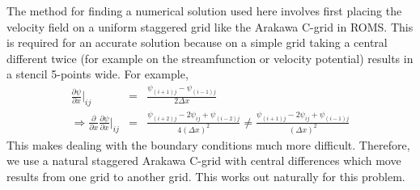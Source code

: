 \documentclass{article}
\begin{document}
The method for finding a numerical solution used here involves first
placing the velocity field on a uniform staggered grid like the
Arakawa C-grid in ROMS. This is required for an accurate solution
because on a simple grid taking a central different twice (for example
on the streamfunction or velocity potential) results in a stencil
5-points wide. For example,
\begin{eqnarray}
  \frac{\partial\psi}{\partial x}|_{ij} & = &
  \frac{\psi_{(i+1)j}-\psi_{(i-1)j}}{2\Delta x} \\
\Longrightarrow  \frac{\partial}{\partial
  x}\frac{\partial\psi}{\partial x}|_{ij} & = &
  \frac{\psi_{(i+2)j}-2\psi_{ij}+\psi_{(i-2)j}}{4(\Delta x)^2}
  \neq   \frac{\psi_{(i+1)j}-2\psi_{ij}+\psi_{(i-1)j}}{(\Delta x)^2}
\end{eqnarray}
This makes dealing with the boundary conditions much
more difficult. Therefore, we use a natural staggered Arakawa C-grid
with central differences which move results from one grid to another
grid. This works out naturally for this problem.
\end{document}
